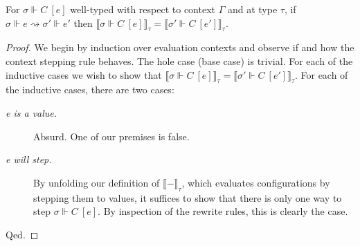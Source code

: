 \begin{lemma}
  For $\sigma \Vdash C~[e]$ well-typed with respect to context $\Gamma$ and at
  type $\tau$, if $\sigma \Vdash e \rightsquigarrow \sigma' \Vdash
  e'$ then 
  $\llbracket \sigma \Vdash C~[e] \rrbracket_\tau 
  = 
  \llbracket \sigma' \Vdash C~[e'] \rrbracket_\tau$.
\end{lemma}
\begin{proof}
  We begin by induction over evaluation contexts and observe if and how the
  context stepping rule behaves. The hole case (base case) is trivial. For each
  of the inductive cases we wish to show that
  $\llbracket \sigma \Vdash C~[e] \rrbracket_\tau 
  = 
  \llbracket \sigma' \Vdash C~[e'] \rrbracket_\tau$.
  For each of the inductive cases, there are two cases:
  \begin{description}
    \item[\textit{e is a value.}] Absurd. One of our premises is false.
    \item[\textit{e will step.}] By unfolding our definition of $\llbracket -
      \rrbracket_\tau$, which evaluates configurations by stepping them to
      values, it suffices to show that there is only one way to step $\sigma
      \Vdash C~[e]$. By inspection of the rewrite rules, this is clearly the case.
  \end{description}
  Qed.
\end{proof}

